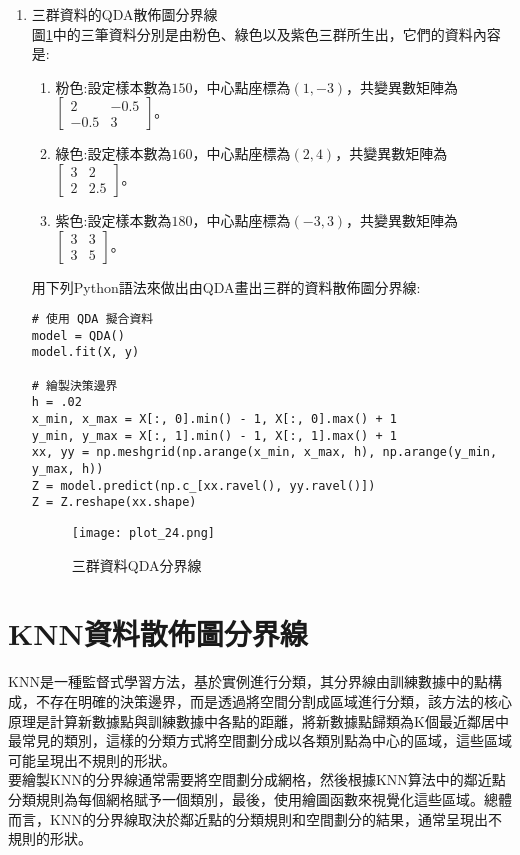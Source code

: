 \documentclass[12pt, a4paper]{article}
\begin{document}
\begin{enumerate}
\item 三群資料的QDA散佈圖分界線\\
圖\;\ref{fig:plot_24.png}\;中的三筆資料分別是由粉色、綠色以及紫色三群所生出，它們的資料內容是\;:
\begin{enumerate}
\item 粉色\;:\;設定樣本數為\;$150$\;，中心點座標為\;$(1,-3)$\;，共變異數矩陣為\;$\begin{bmatrix}2 & -0.5 \\-0.5 & 3 \end{bmatrix}$\;。
\item 綠色\;:\;設定樣本數為\;$160$\;，中心點座標為\;$(2,4)$\;，共變異數矩陣為\;$\begin{bmatrix}3 & 2 \\2 & 2.5 \end{bmatrix}$\;。
\item 紫色\;:\;設定樣本數為\;$180$\;，中心點座標為\;$(-3,3)$\;，共變異數矩陣為\;$\begin{bmatrix}3 & 3 \\3 & 5 \end{bmatrix}$\;。
\end{enumerate}

用下列Python語法來做出由QDA畫出三群的資料散佈圖分界線\;:
\begin{lstlisting}
# 使用 QDA 擬合資料
model = QDA()
model.fit(X, y)

# 繪製決策邊界
h = .02 
x_min, x_max = X[:, 0].min() - 1, X[:, 0].max() + 1
y_min, y_max = X[:, 1].min() - 1, X[:, 1].max() + 1
xx, yy = np.meshgrid(np.arange(x_min, x_max, h), np.arange(y_min, y_max, h))
Z = model.predict(np.c_[xx.ravel(), yy.ravel()])
Z = Z.reshape(xx.shape)
\end{lstlisting}

\begin{figure}[H]
\centering
\texttt{[image: plot\_24.png]}
\caption{三群資料QDA分界線}
\label{fig:plot_24.png}
\end{figure}
\end{enumerate}


\section{KNN資料散佈圖分界線}
KNN是一種監督式學習方法，基於實例進行分類，其分界線由訓練數據中的點構成，不存在明確的決策邊界，而是透過將空間分割成區域進行分類，該方法的核心原理是計算新數據點與訓練數據中各點的距離，將新數據點歸類為K個最近鄰居中最常見的類別，這樣的分類方式將空間劃分成以各類別點為中心的區域，這些區域可能呈現出不規則的形狀。\\
要繪製KNN的分界線通常需要將空間劃分成網格，然後根據KNN算法中的鄰近點分類規則為每個網格賦予一個類別，最後，使用繪圖函數來視覺化這些區域。總體而言，KNN的分界線取決於鄰近點的分類規則和空間劃分的結果，通常呈現出不規則的形狀。
\end{document}
